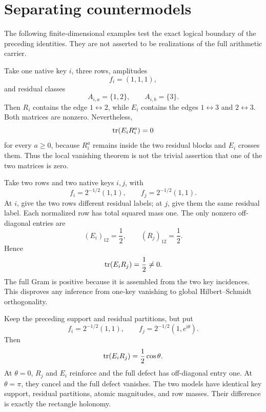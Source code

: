 \section{Separating countermodels}
\label{sec:countermodels}

The following finite-dimensional examples test the exact logical boundary
of the preceding identities.  They are not asserted to be realizations of
the full arithmetic carrier.

\begin{example}
\label{ex:one-key-both-defects}
Take one native key \(i\), three rows, amplitudes
\[
 f_i=(1,1,1),
\]
and residual classes
\[
 A_{i,a}=\{1,2\},\qquad A_{i,b}=\{3\}.
\]
Then \(R_i\) contains the edge \(1\leftrightarrow2\), while \(E_i\)
contains the edges \(1\leftrightarrow3\) and
\(2\leftrightarrow3\).  Both matrices are nonzero.  Nevertheless,
\[
 \operatorname{tr}(E_iR_i^a)=0
\]
for every \(a\ge0\), because \(R_i^a\) remains inside the two residual
blocks and \(E_i\) crosses them.  Thus the local vanishing theorem is not
the trivial assertion that one of the two matrices is zero.
\end{example}

\begin{example}
\label{ex:two-key-first-rectangle}
Take two rows and two native keys \(i,j\), with
\[
 f_i=2^{-1/2}(1,1),\qquad
 f_j=2^{-1/2}(1,1).
\]
At \(i\), give the two rows different residual labels; at \(j\), give them
the same residual label.  Each normalized row has total squared mass one.
The only nonzero off-diagonal entries are
\[
 (E_i)_{12}=\frac12,\qquad
 (R_j)_{12}=\frac12.
\]
Hence
\[
 \operatorname{tr}(E_iR_j)=\frac12\ne0.
\]
The full Gram is positive because it is assembled from the two key
incidences.  This disproves any inference from one-key vanishing to global
Hilbert--Schmidt orthogonality.
\end{example}

\begin{example}
\label{ex:holonomy-phase}
Keep the preceding support and residual partitions, but put
\[
 f_i=2^{-1/2}(1,1),\qquad
 f_j=2^{-1/2}(1,e^{\mathrm i\theta}).
\]
Then
\[
 \operatorname{tr}(E_iR_j)=\frac12\cos\theta.
\]
At \(\theta=0\), \(R_j\) and \(E_i\) reinforce and the full defect has
off-diagonal entry one.  At \(\theta=\pi\), they cancel and the full defect
vanishes.  The two models have identical key support, residual partitions,
atomic magnitudes, and row masses.  Their difference is exactly the
rectangle holonomy.
\end{example}

